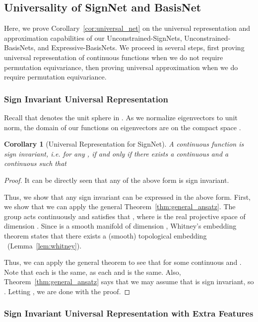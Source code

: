 \documentclass{article} \usepackage{iclr2023_conference,times}
\newtheorem{corollary}{Corollary}
\begin{document}
\subsection{Universality of SignNet and BasisNet}\label{appdx: niversality of SignNet and BasisNet}

Here, we prove Corollary~\ref{cor:universal_net} on the universal representation and approximation capabilities of our Unconstrained-SignNets, Unconstrained-BasisNets, and Expressive-BasisNets. We proceed in several steps, first proving universal representation of continuous functions when we do not require permutation equivariance, then proving universal approximation when we do require permutation equivariance.


\subsubsection{Sign Invariant Universal Representation}

Recall that  denotes the unit sphere in . As we normalize eigenvectors to unit norm, the domain of our functions on  eigenvectors are on the compact space .

\begin{corollary}[Universal Representation for SignNet]\label{thm:no_feature_sign_inv}
    A continuous function  is sign invariant, i.e.  for any , if and only if there exists a continuous  and a continuous  such that
    
\end{corollary}
\begin{proof}
    It can be directly seen that any  of the above form is sign invariant.

    Thus, we show that any sign invariant  can be expressed in the above form.
    First, we show that we can apply the general Theorem~\ref{thm:general_ansatz}. The group  acts continuously and satisfies that , where  is the real projective space of dimension . Since  is a smooth manifold of dimension , Whitney's embedding theorem states that there exists a (smooth) topological embedding ~(Lemma~\ref{lem:whitney}).

    Thus, we can apply the general theorem to see that  for some continuous  and . Note that each  is the same, as each  and  is the same. Also, Theorem~\ref{thm:general_ansatz} says that we may assume that  is sign invariant, so . Letting , we are done with the proof.
\end{proof}


\subsubsection{Sign Invariant Universal Representation with Extra Features}
\end{document}

